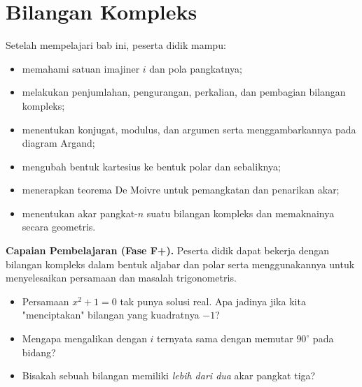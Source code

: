 \documentclass[11pt,a4paper]{report}
\theoremstyle{gaya}
\begin{document}
\chapter{Bilangan Kompleks}
\begin{tujuan}
Setelah mempelajari bab ini, peserta didik mampu:
\begin{itemize}[leftmargin=*,topsep=2pt]
  \item memahami satuan imajiner $i$ dan pola pangkatnya;
  \item melakukan penjumlahan, pengurangan, perkalian, dan pembagian bilangan kompleks;
  \item menentukan konjugat, modulus, dan argumen serta menggambarkannya pada diagram Argand;
  \item mengubah bentuk kartesius ke bentuk polar dan sebaliknya;
  \item menerapkan teorema De Moivre untuk pemangkatan dan penarikan akar;
  \item menentukan akar pangkat-$n$ suatu bilangan kompleks dan memaknainya secara geometris.
\end{itemize}
\textbf{Capaian Pembelajaran (Fase F+).} Peserta didik dapat bekerja dengan bilangan kompleks dalam bentuk aljabar dan polar serta menggunakannya untuk menyelesaikan persamaan dan masalah trigonometris.
\end{tujuan}

\begin{pemantik}
\begin{itemize}[leftmargin=*,topsep=2pt]
  \item Persamaan $x^2+1=0$ tak punya solusi real. Apa jadinya jika kita "menciptakan" bilangan yang kuadratnya $-1$?
  \item Mengapa mengalikan dengan $i$ ternyata sama dengan memutar $90^\circ$ pada bidang?
  \item Bisakah sebuah bilangan memiliki \emph{lebih dari dua} akar pangkat tiga?
\end{itemize}
\end{pemantik}
\end{document}
